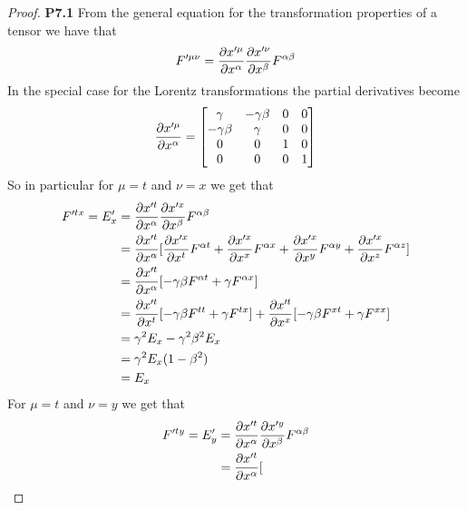 \documentclass[11pt]{article}
\theoremstyle{definition}
\begin{document}
\begin{proof}{\textbf{P7.1}}
    From the general equation for the transformation properties of a tensor
    we have that
    \begin{align*}
        F'^{\mu\nu} = \partialderivative{x'^\mu}{x^\alpha}
        \partialderivative{x'^\nu}{x^\beta} F^{\alpha\beta}
    \end{align*}
    In the special case for the Lorentz transformations the partial derivatives
    become
    \begin{align*}
        \partialderivative{x'^\mu}{x^\alpha} = \begin{bmatrix}
            \gamma & -\gamma\beta & 0 & 0\\
            -\gamma\beta & \gamma & 0 & 0\\
            0 & 0 & 1 & 0\\
            0 & 0 & 0 & 1
        \end{bmatrix}
    \end{align*}
    So in particular for $\mu=t$ and $\nu=x$ we get that
    \begin{align*}
        F'^{tx} = E'_x &= \partialderivative{x'^t}{x^\alpha}
        \partialderivative{x'^x}{x^\beta} F^{\alpha\beta}\\
        &= \partialderivative{x'^t}{x^\alpha}[
            \partialderivative{x'^x}{x^t} F^{\alpha t}
            + \partialderivative{x'^x}{x^x} F^{\alpha x}
            + \partialderivative{x'^x}{x^y} F^{\alpha y}
            + \partialderivative{x'^x}{x^z} F^{\alpha z}
        ]\\
        &= \partialderivative{x'^t}{x^\alpha}[
            -\gamma\beta F^{\alpha t}
            + \gamma F^{\alpha x}
        ]\\
        &= \partialderivative{x'^t}{x^t}[
            -\gamma\beta F^{t t}
            + \gamma F^{t x}
        ] + \partialderivative{x'^t}{x^x}[
            -\gamma\beta F^{x t}
            + \gamma F^{x x}
        ]\\
        &= \gamma^2 E_x - \gamma^2\beta^2 E_x\\
        &= \gamma^2 E_x(1 - \beta^2)\\
        &= E_x
    \end{align*}
    For $\mu=t$ and $\nu=y$ we get that
    \begin{align*}
        F'^{ty} = E'_y &= \partialderivative{x'^t}{x^\alpha}
        \partialderivative{x'^y}{x^\beta} F^{\alpha\beta}\\
        &= \partialderivative{x'^t}{x^\alpha}[

\end{align*}
\end{proof}
\end{document}
